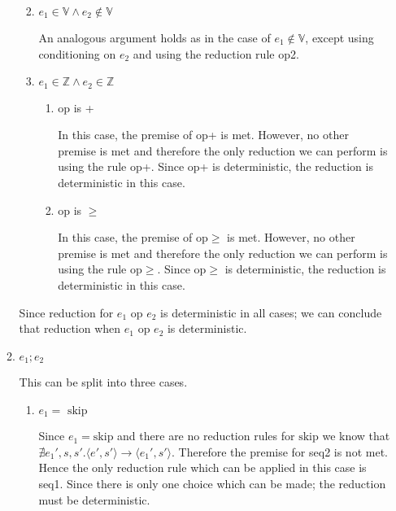 \documentclass[10pt,\jkfside,a4paper]{article}
\begin{document}
\begin{enumerate}
\begin{enumerate}[label=\textbf{Case}]
\begin{enumerate}[label=\textbf{Case}]
\begin{enumerate}[label=\textbf{Case}]
\end{enumerate}

\item $e_1 \in \mathbb{V} \wedge e_2 \notin \mathbb{V}$

An analogous argument holds as in the case of $e_1 \notin \mathbb{V}$,
except using conditioning on $e_2$ and using the reduction rule op2.

\item $e_1 \in \mathbb{Z} \wedge e_2 \in \mathbb{Z}$

\begin{enumerate}[label=\textbf{Case}]

\item op is +

In this case, the premise of op+ is met. However, no other premise
is met and therefore the only reduction we can perform is using the rule op+.
Since op+ is deterministic, the reduction is deterministic in this case.

\item op is $\geq$

In this case, the premise of op$\geq$ is met. However, no other
premise is met and therefore the only reduction we can perform is
using the rule op$\geq$. Since op$\geq$ is deterministic, the reduction is
deterministic in this case.

\end{enumerate}

\end{enumerate}

Since reduction for $e_1 \text{ op } e_2$ is deterministic in all cases; we
can conclude that reduction when $e_1 \text{ op } e_2$ is deterministic.

\iffalse

\item $e_1; e_2$

This can be split into three cases.

\begin{enumerate}[label=\textbf{Case}]

\item $e_1 = \text{ skip}$

Since $e_1 = \text{skip}$ and there are no reduction rules for
$\text{skip}$ we know that $\nexists e_1', s, s'. \langle e', s' \rangle
\to \langle e_1', s' \rangle $. Therefore the premise for
seq2 is not met. Hence the only reduction rule which can be applied in this
case is seq1. Since there is only one choice which can be made; the
reduction must be deterministic.


\end{enumerate}
\end{enumerate}
\end{enumerate}
\end{document}
